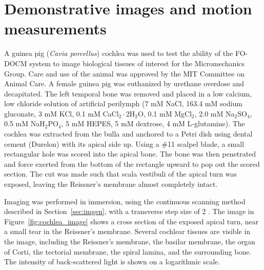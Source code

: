 \section{Demonstrative images and motion measurements}

A guinea pig ({\em Cavia porcellus}) cochlea was used to test the ability of the FO-DOCM system to image biological tissues of interest for the Micromechanics Group. Care and use of the animal was approved by the MIT Committee on Animal Care. A female guinea pig was euthanized by urethane overdose and decapitated. The left temporal bone was removed and placed in a low calcium, low chloride solution of artificial perilymph (7 mM NaCl, 163.4 mM sodium gluconate, 3 mM KCl, 0.1 mM CaCl$_2\cdot$2H$_2$O, 0.1 mM MgCl$_2$, 2.0 mM Na$_2$SO$_4$, 0.5 mM NaH$_2$PO$_4$, 5 mM HEPES, 5 mM dextrose, 4 mM L-glutamine). The cochlea was extracted from the bulla and anchored to a Petri dish using dental cement (Durelon) with its apical side up. Using a $\#$11 scalpel blade, a small rectangular hole was scored into the apical bone. The bone was then penetrated and force exerted from the bottom of the rectangle upward to pop out the scored section. The cut was made such that scala vestibuli of the apical turn was exposed, leaving the Reissner’s membrane almost completely intact.

Imaging was performed in immersion, using the continuous scanning method described in Section~\ref{sec:imgen}, with a transverse step size of 2 \micron. The image in Figure~\ref{fig:cochlea_image} shows a cross section of the exposed apical turn, near a small tear in the Reissner's membrane. Several cochlear tissues are visible in the image, including the Reissner's membrane, the basilar membrane, the organ of Corti, the tectorial membrane, the spiral lamina, and the surrounding bone. The intensity of back-scattered light is shown on a logarithmic scale.


